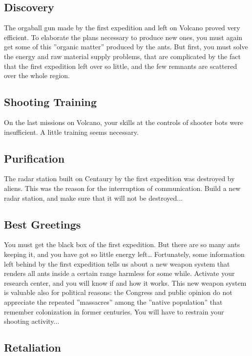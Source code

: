 \subsection{Discovery}

The orgaball gun made by the first expedition and left on Volcano proved very efficient. To elaborate the plans necessary to produce new ones, you must again get some of this ''organic matter'' produced by the ants. But first, you must solve the energy and raw material supply problems, that are complicated by the fact that the first expedition left over so little, and the few remnants are scattered over the whole region.


\subsection{Shooting Training}

On the last missions on Volcano, your skills at the controls of shooter bots were insufficient. A little training seems necessary.


\subsection{Purification}

The radar station built on Centaury by the first expedition was destroyed by aliens. This was the reason for the interruption of communication. Build a new radar station, and make sure that it will not be destroyed...


\subsection{Best Greetings}

You must get the black box of the first expedition. But there are so many ants keeping it, and you have got so little energy left… Fortunately, some information left behind by the first expedition tells us about a new weapon system that renders all ants inside a certain range harmless for some while. Activate your research center, and you will know if and how it works. This new weapon system is valuable also for political reasons: the Congress and public opinion do not appreciate the repeated ''massacres'' among the ''native population'' that remember colonization in former centuries. You will have to restrain your shooting activity...


\subsection{Retaliation}

